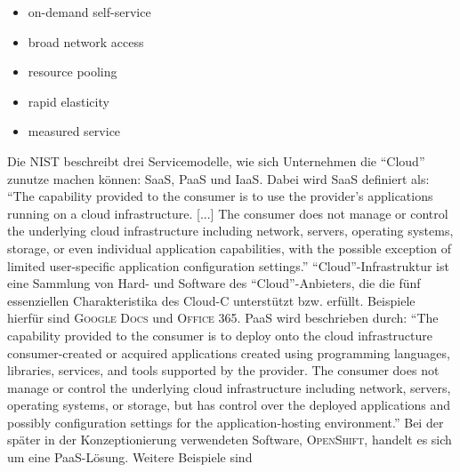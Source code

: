 \begin{itemize}
	\item on-demand self-service
	\item broad network access
	\item resource pooling
	\item rapid elasticity
	\item measured service
\end{itemize}
Die \ac{NIST} beschreibt drei Servicemodelle, wie sich Unternehmen die \enquote{Cloud} zunutze machen können: \ac{SaaS}, \ac{PaaS} und \ac{IaaS}. Dabei wird \ac{SaaS} definiert als: \enquote{The capability  provided to the consumer is to use the provider’s applications running on a cloud infrastructure. [...] The consumer does not manage or control the underlying cloud infrastructure including network, servers, operating systems, storage, or even individual application capabilities, with the possible exception of limited user-specific application configuration settings.}\autocite[][S.\,2]{mell_nist_2011} \enquote{Cloud}-Infrastruktur ist eine Sammlung von Hard- und Software des \enquote{Cloud}-Anbieters, die die fünf essenziellen Charakteristika des \ac{Cloud-C} unterstützt bzw. erfüllt. Beispiele hierfür sind \textsc{Google Docs} und \textsc{Office 365}. \ac{PaaS} wird beschrieben durch: \enquote{The capability provided to the consumer is to deploy onto the cloud infrastructure consumer-created or acquired applications created using programming languages, libraries, services, and tools supported by the provider. The consumer does
not manage or control the underlying cloud infrastructure including network, servers, operating systems, or storage, but has control over the deployed applications and possibly configuration settings for the application-hosting environment.}\autocite[][S.\,2]{mell_nist_2011} Bei der später in der Konzeptionierung verwendeten Software, \textsc{OpenShift}, handelt es sich um eine \ac{PaaS}-Lösung. Weitere Beispiele sind 
